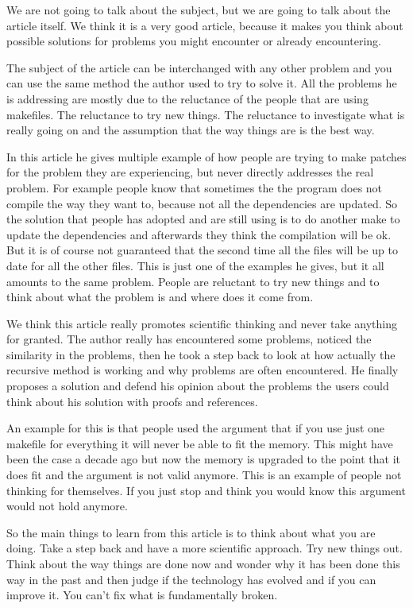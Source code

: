 

We are not going to talk about the subject, but we are going to talk about the article itself. We think it is a very good article, because it makes you think about possible solutions for problems you might encounter or already encountering.

The subject of the article can be interchanged with any other problem and you can use the same method the author used to try to solve it.
All the problems he is addressing are mostly due to the reluctance of the people that are using makefiles. The reluctance to try new things. The reluctance to investigate what is really going on and the assumption that the way things are is the best way.

In this article he gives multiple example of how people are trying to make patches for the problem they are experiencing, but never directly addresses the real problem. For example people know that sometimes the the program does not compile the way they want to, because not all the dependencies are updated. So the solution that people has adopted and are still using is to do another make to update the dependencies and afterwards they think the compilation will be ok. But it is of course not guaranteed that the second time all the files will be up to date for all the other files. This is just one of the examples he gives, but it all amounts to the same problem. People are reluctant to try new things and to think about what the problem is and where does it come from.\cite{recursivemake}

We think this article really promotes scientific thinking and never take anything for granted. The author really has encountered some problems, noticed the similarity in the problems, then he took a step back to look at how actually the recursive method is working and why problems are often encountered. He finally proposes a solution and defend his opinion about the problems the users could think about his solution with proofs and references.

An example for this is that people used the argument that if you use just one makefile for everything it will never be able to fit the memory. This might have been the case a decade ago but now the memory is upgraded to the point that it does fit and the argument is not valid anymore. This is an example of people not thinking for themselves. If you just stop and think you would know this argument would not hold anymore.

So the main things to learn from this article is to think about what you are doing. Take a step back and have a more scientific approach. Try new things out. Think about the way things are done now and wonder why it has been done this way in the past and then judge if the technology has evolved and if you can improve it. You can't fix what is fundamentally broken.

